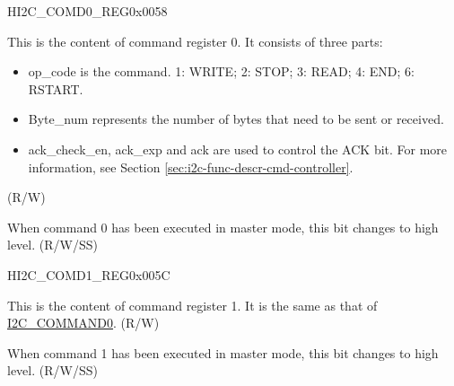 \begin{register}{H}{I2C\_COMD0\_REG}{0x{}0058}\label{regdesc:I2CCOMD0REG}
%
%
%
\regnewline%
\begin{regdesc}\begin{reglist}
\label{fielddesc:I2CCOMMAND0}\item [I2C\_COMMAND0] This is the content of command register 0. It consists of three parts: 
\begin{itemize}
    \item op\_code is the command. 1: WRITE; 2: STOP; 3: READ; 4: END; 6: RSTART.
    \item Byte\_num represents the number of bytes that need to be sent or received.
    \item ack\_check\_en, ack\_exp and ack are used to control the ACK bit. For more information, see Section \ref{sec:i2c-func-descr-cmd-controller}.
\end{itemize} (R/W)
\label{fielddesc:I2CCOMMAND0DONE}\item [I2C\_COMMAND0\_DONE] When command 0 has been executed in master mode, this bit changes to high level. (R/W/SS)
\end{reglist}\end{regdesc}
\end{register}


\begin{register}{H}{I2C\_COMD1\_REG}{0x{}005C}\label{regdesc:I2CCOMD1REG}
%
%
%
\regnewline%
\begin{regdesc}\begin{reglist}
\label{fielddesc:I2CCOMMAND1}\item [I2C\_COMMAND1] This is the content of command register 1. It is the same as that of \hyperref[fielddesc:I2CCOMMAND0]{I2C\_COMMAND0}. (R/W)
\label{fielddesc:I2CCOMMAND1DONE}\item [I2C\_COMMAND1\_DONE] When command 1 has been executed in master mode, this bit changes to high
level. (R/W/SS)
\end{reglist}\end{regdesc}
\end{register}


